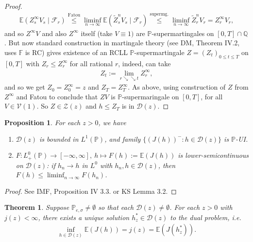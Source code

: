 \documentclass[12pt,a4paper, twoside]{article}
\newtheorem{thm}{Theorem}[section]
\newtheorem{prop}{Proposition}[section]
\theoremstyle{definition}
\newcommand{\EE}{\mathbb{E}} %
\newcommand{\PP}{\mathbb{P}} %
\begin{document}
\begin{proof}
\begin{align*}
\EE(Z_s^\infty V_s \mid \mathcal{F}_r) \overset{\text{Fatou}}\leq \liminf_{n \to \infty} \EE( \widetilde{Z}_s^n V_s \mid \mathcal{F}_r) \overset{\text{supermg.}}\leq \liminf_{n \to \infty} \widetilde{Z}_r^n V_r = Z_r^\infty V_r,
\end{align*}
and so $Z^\infty V$ and also $Z^\infty$ itself (take $V \equiv 1)$ are $\PP$-supermartingales on $[0,T] \cap \mathbb{Q}$. But now standard construction in martingale theory (see DM, Theorem IV.2, uses $\mathbb{F}$ is RC) gives existence of an RCLL $\PP$-supermartingale $Z=(Z_t)_{0 \leq t \leq T}$ on $[0,T]$ with $Z_r \leq Z_r^\infty$ for all rational $r$, indeed, can take 
\begin{align*}
Z_t:= \lim_{r \searrow \searrow t} Z_r^\infty,
\end{align*}
and so we get $Z_0 = Z_0^\infty = z$ and $Z_T= Z_T^\infty$. As above, using construction of $Z$ from $Z^\infty$ and Fatou to conclude that $ZV$ is $\PP$-supermaringale on $[0,T]$, for all $V \in \mathcal{V}(1)$. So $Z \in \mathcal{Z}(z)$ and $h \leq Z_T$ is in $\mathcal{D}(z)$. 
\end{proof}
\begin{prop} \label{P113} For each $z >0$, we have 
\begin{enumerate}
\item $\mathcal{D}(z)$ is bounded in $L^1(\PP)$, and family $\{(J(h))^- : h \in \mathcal{D}(z)\}$ is $\PP$-UI. 
\item $F: L_+^0( \PP) \to [- \infty, \infty], \ h \mapsto F(h):= \EE(J(h))$ is lower-semicontinuous on $\mathcal{D}(z)$: if $h_n \to h$ in $L^0$ with $h_n, h \in \mathcal{D}(z)$, then $F(h) \leq \liminf_{n \to \infty} F(h_n)$. 
\end{enumerate}
\end{prop}
\begin{proof}
See IMF, Proposition IV 3.3. or KS Lemma 3.2.
\end{proof}
\newpage
\begin{thm} \label{T114} Suppose $\PP_{e, \sigma} \neq \emptyset$ so that each $\mathcal{D}(z) \neq \emptyset$. For each $z>0$ with $j(z) < \infty$, there exists a unique solution $h_z^* \in \mathcal{D}(z)$ to the dual problem, i.e. 
\begin{align*}
\inf_{h \in \mathcal{D}(z)} \EE(J(h)) = j(z) = \EE(J(h_z^*)). 
\end{align*}
\end{thm}
\end{document}
